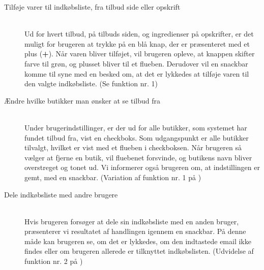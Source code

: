 \begin{minipage}{\textwidth}
\begin{description}
\item[Tilføje varer til indkøbsliste, fra tilbud side eller opskrift]\hfill\\
Ud for hvert tilbud, på tilbuds siden, og ingredienser på opskrifter, er det muligt for brugeren at trykke på en blå knap, der er præsenteret med et plus (\textbf{+}). 
Når varen bliver tilføjet, vil brugeren opleve, at knappen skifter farve til grøn, og plusset bliver til et flueben.
Derudover vil en snackbar komme til syne med en besked om, at det er lykkedes at tilføje varen til den valgte indkøbsliste.
(Se  funktion nr. 1)
\item[Ændre hvilke butikker man ønsker at se tilbud fra]\hfill\\
Under brugerindstillinger, er der ud for alle butikker, som systemet har fundet tilbud fra, vist en checkboks.
Som udgangspunkt er alle butikker tilvalgt, hvilket er vist med et flueben i checkboksen.
Når brugeren så vælger at fjerne en butik, vil fluebenet forsvinde, og butikens navn bliver overstreget og tonet ud.
Vi informerer også brugeren om, at indstillingen er gemt, med en snackbar.
(Variation af funktion nr. 1 på )
\item[Dele indkøbsliste med andre brugere]\hfill\\
Hvis brugeren forsøger at dele sin indkøbsliste med en anden bruger, præsenterer vi resultatet af handlingen igennem en snackbar.
På denne måde kan brugeren se, om det er lykkedes, om den indtastede email ikke findes eller om brugeren allerede er tilknyttet indkøbslisten.
(Udvidelse af funktion nr. 2 på )
\end{description}
\end{minipage}
\vspace{15pt}

